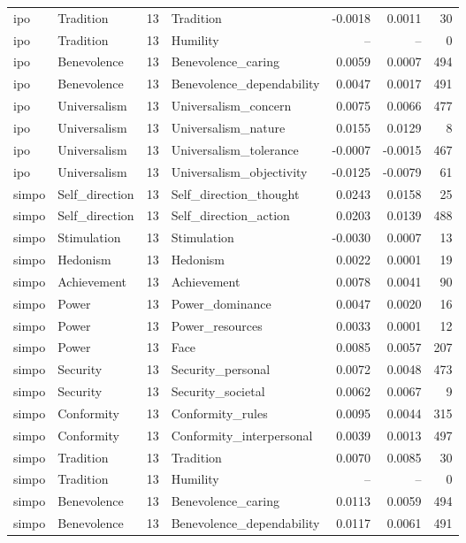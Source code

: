 \begin{tabular}{llrlrrr}
ipo & Tradition & 13 & Tradition & -0.0018 & 0.0011 & 30 \\
ipo & Tradition & 13 & Humility & -- & -- & 0 \\
ipo & Benevolence & 13 & Benevolence\_caring & 0.0059 & 0.0007 & 494 \\
ipo & Benevolence & 13 & Benevolence\_dependability & 0.0047 & 0.0017 & 491 \\
ipo & Universalism & 13 & Universalism\_concern & 0.0075 & 0.0066 & 477 \\
ipo & Universalism & 13 & Universalism\_nature & 0.0155 & 0.0129 & 8 \\
ipo & Universalism & 13 & Universalism\_tolerance & -0.0007 & -0.0015 & 467 \\
ipo & Universalism & 13 & Universalism\_objectivity & -0.0125 & -0.0079 & 61 \\
simpo & Self\_direction & 13 & Self\_direction\_thought & 0.0243 & 0.0158 & 25 \\
simpo & Self\_direction & 13 & Self\_direction\_action & 0.0203 & 0.0139 & 488 \\
simpo & Stimulation & 13 & Stimulation & -0.0030 & 0.0007 & 13 \\
simpo & Hedonism & 13 & Hedonism & 0.0022 & 0.0001 & 19 \\
simpo & Achievement & 13 & Achievement & 0.0078 & 0.0041 & 90 \\
simpo & Power & 13 & Power\_dominance & 0.0047 & 0.0020 & 16 \\
simpo & Power & 13 & Power\_resources & 0.0033 & 0.0001 & 12 \\
simpo & Power & 13 & Face & 0.0085 & 0.0057 & 207 \\
simpo & Security & 13 & Security\_personal & 0.0072 & 0.0048 & 473 \\
simpo & Security & 13 & Security\_societal & 0.0062 & 0.0067 & 9 \\
simpo & Conformity & 13 & Conformity\_rules & 0.0095 & 0.0044 & 315 \\
simpo & Conformity & 13 & Conformity\_interpersonal & 0.0039 & 0.0013 & 497 \\
simpo & Tradition & 13 & Tradition & 0.0070 & 0.0085 & 30 \\
simpo & Tradition & 13 & Humility & -- & -- & 0 \\
simpo & Benevolence & 13 & Benevolence\_caring & 0.0113 & 0.0059 & 494 \\
simpo & Benevolence & 13 & Benevolence\_dependability & 0.0117 & 0.0061 & 491 \\

\end{tabular}
